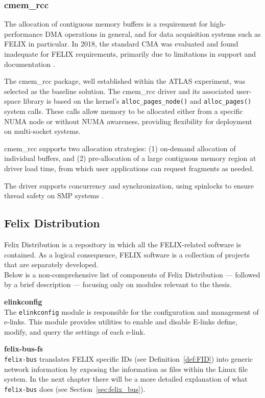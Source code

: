\subsubsection{cmem\_rcc}

The allocation of contiguous memory buffers is a requirement for high-performance \acf{DMA} operations in general, and for data acquisition systems such as \acs{FELIX} in particular. In 2018, the standard \ac{CMA} was evaluated and found inadequate for \ac{FELIX} requirements, primarily due to limitations in support and documentation \cite{cmem-rcc}.

The cmem\_rcc \cite{cmem-rcc} package, well established within the \acs{ATLAS} experiment, was selected as the baseline solution. The cmem\_rcc driver and its associated user-space library is based on the kernel's \texttt{alloc\_pages\_node()} and \texttt{alloc\_pages()} system calls. These calls allow memory to be allocated either from a specific \ac{NUMA} node or without \ac{NUMA} awareness, providing flexibility for deployment on multi-socket systems.

cmem\_rcc supports two allocation strategies: (1) on-demand allocation of individual buffers, and (2) pre-allocation of a large contiguous memory region at driver load time, from which user applications can request fragments as needed.

The driver supports concurrency and synchronization, using spinlocks to ensure thread safety on \ac{SMP} systems \cite{cmem-rcc}.

\subsection{Felix Distribution}

Felix Distribution \cite{felix-distribution} is a repository in which all the \acs{FELIX}-related software is contained. As a logical consequence, \acs{FELIX} software is a collection of projects that are separately developed.\\
Below is a non-comprehensive list of components of Felix Distribution --- followed by a brief description --- focusing only on modules relevant to the thesis.

\textbf{elinkconfig}\\
The \texttt{elinkconfig} module is responsible for the configuration and management of e-links. This module provides utilities to enable and disable \acs{E-link}s define, modify, and query the settings of each e-link.

\textbf{felix-bus-fs}\\
\texttt{felix-bus} translates \acs{FELIX} specific IDs (see Definition~\ref{def:FID}) into generic network information by exposing the information as files within the Linux file system. In the next chapter there will be a more detailed explanation of what \texttt{felix-bus} does (see Section~\ref{sec:felix_bus}).

